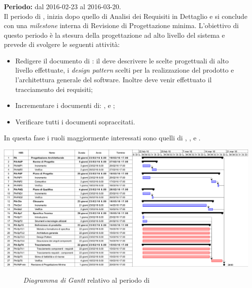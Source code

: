 \subsubsection{\PA}
\textbf{Periodo:} dal 2016-02-23 al 2016-03-20. \\
Il periodo di \PA, inizia dopo quello di Analisi dei Requisiti in Dettaglio e si conclude con una \textit{milestone} interna di Revisione di Progettazione minima. L'obiettivo di questo periodo è la stesura della progettazione ad alto livello del sistema e prevede di svolgere le seguenti attività:
\begin{itemize}
	\item Redigere il documento di \textit{\ST}: il \textit{\Prog} deve descrivere le scelte progettuali di alto livello effettuate, i \textit{design pattern} scelti per la realizzazione del prodotto e l'architettura generale del software. Inoltre deve venir effettuato il tracciamento dei requisiti;
	\item Incrementare i documenti di: \textit{\NdP}, \textit{\PdP} e \textit{\PdQ};
	\item Verificare tutti i documenti sopraccitati.
\end{itemize}
In questa fase i ruoli maggiormente interessati sono quelli di \textit{\Amm}, \textit{\Res}, \textit{\Prog} e \textit{\Ver}.
\begin{center}
	\includegraphics[keepaspectratio = true, width=16cm]{immagini/PdP_ProgettazioneArchitetturaleGantt.png}
\end{center}
\begin{figure}[h]
	\caption{\textit{Diagramma di Gantt} relativo al periodo di \PA}\label{etichetta}
\end{figure}


